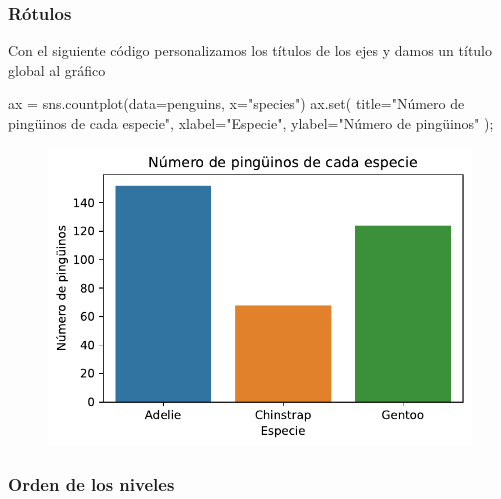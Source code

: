 \documentclass[
  a4paper,
  noprof,
  12pt,
  notoc,
  nosols,
  nobib]{mnye}
\newenvironment{Shaded}{\begin{snugshade}}{\end{snugshade}}
\newcommand{\BuiltInTok}[1]{\textcolor[rgb]{0.00,0.23,0.31}{#1}}
\newcommand{\NormalTok}[1]{\textcolor[rgb]{0.00,0.23,0.31}{#1}}
\newcommand{\OperatorTok}[1]{\textcolor[rgb]{0.37,0.37,0.37}{#1}}
\newcommand{\StringTok}[1]{\textcolor[rgb]{0.13,0.47,0.30}{#1}}
\theoremstyle{definition}
\theoremstyle{remark}
\begin{document}
\hypertarget{ruxf3tulos}{%
\subsubsection{Rótulos}\label{ruxf3tulos}}

Con el siguiente código personalizamos los títulos de los ejes y damos
un título global al gráfico

\begin{Shaded}
\begin{Highlighting}[]
\NormalTok{ax }\OperatorTok{=}\NormalTok{ sns.countplot(data}\OperatorTok{=}\NormalTok{penguins, x}\OperatorTok{=}\StringTok{"species"}\NormalTok{)}
\NormalTok{ax.}\BuiltInTok{set}\NormalTok{(}
\NormalTok{    title}\OperatorTok{=}\StringTok{"Número de pingüinos de cada especie"}\NormalTok{,}
\NormalTok{    xlabel}\OperatorTok{=}\StringTok{"Especie"}\NormalTok{, }
\NormalTok{    ylabel}\OperatorTok{=}\StringTok{"Número de pingüinos"}
\NormalTok{)}\OperatorTok{;}
\end{Highlighting}
\end{Shaded}

\begin{figure}[tbph]

{\centering \includegraphics{chapters/1categorical_files/figure-pdf/cell-11-output-1.pdf}

}

\end{figure}

\hypertarget{orden-de-los-niveles}{%
\subsubsection{Orden de los niveles}\label{orden-de-los-niveles}}
\end{document}
